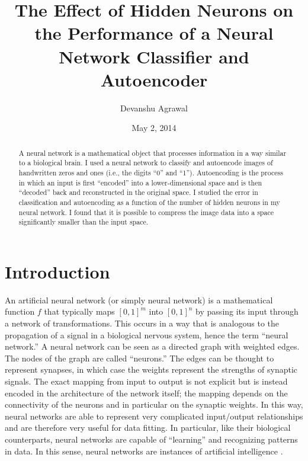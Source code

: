 \documentclass[12pt]{article}
\title{The Effect of Hidden Neurons on the Performance of a Neural Network Classifier and Autoencoder}
\author{Devanshu Agrawal}
\date{May 2, 2014}
\begin{document}
\maketitle

\begin{abstract}
A neural network is a mathematical object that processes information in a way similar to a biological brain. I used a neural network to classify and autoencode images of handwritten zeros and ones (i.e., the digits ``0'' and ``1''). Autoencoding is the process in which an input is first ``encoded'' into a lower-dimensional space and is then ``decoded'' back and reconstructed in the original space. I studied the error in classification and autoencoding as a function of the number of hidden neurons in my neural network. I found that it is possible to compress the image data into a space significantly smaller than the input space.
\end{abstract}

\section{Introduction}

An artificial neural network (or simply neural network) is a mathematical function $f$ that typically maps $[0,1]^m$ into $[0,1]^n$ by passing its input through a network of transformations. This occurs in a way that is analogous to the propagation of a signal in a biological nervous system, hence the term ``neural network.'' A neural network can be seen as a directed graph with weighted edges. The nodes of the graph are called ``neurons.'' The edges can be thought to represent synapses, in which case the weights represent the strengths of synaptic signals. The exact mapping from input to output is not explicit but is instead encoded in the architecture of the network itself; the mapping depends on the connectivity of the neurons and in particular on the synaptic weights. In this way, neural networks are able to represent very complicated input/output relationships and are therefore very useful for data fitting. In particular, like their biological counterparts, neural networks are capable of ``learning'' and recognizing patterns in data. In this sense, neural networks are instances of artificial intelligence \cite{neural}.
\end{document}
